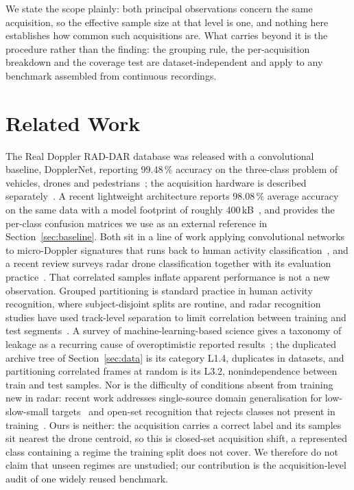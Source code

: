 \documentclass[conference]{IEEEtran}
\begin{document}
We state the scope plainly: both principal observations concern the same acquisition, so the effective sample size at that level is one, and nothing here establishes how common such acquisitions are. What carries beyond it is the procedure rather than the finding: the grouping rule, the per-acquisition breakdown and the coverage test are dataset-independent and apply to any benchmark assembled from continuous recordings.
\section{Related Work}
The Real Doppler RAD-DAR database was released with a convolutional baseline, DopplerNet, reporting 99.48\,\% accuracy on the three-class problem of vehicles, drones and pedestrians~\cite{roldan2020}; the acquisition hardware is described separately~\cite{quevedo2019}. A recent lightweight architecture reports 98.08\,\% average accuracy on the same data with a model footprint of roughly 400\,kB~\cite{zhang2025}, and provides the per-class confusion matrices we use as an external reference in Section~\ref{sec:baseline}. Both sit in a line of work applying convolutional networks to micro-Doppler signatures that runs back to human activity classification~\cite{kim2016}, and a recent review surveys radar drone classification together with its evaluation practice~\cite{ahmad2023}.
That correlated samples inflate apparent performance is not a new observation. Grouped partitioning is standard practice in human activity recognition, where subject-disjoint splits are routine, and radar recognition studies have used track-level separation to limit correlation between training and test segments~\cite{buchman2022}. A survey of machine-learning-based science gives a taxonomy of leakage as a recurring cause of overoptimistic reported results~\cite{kapoor2023}; the duplicated archive tree of Section~\ref{sec:data} is its category L1.4, duplicates in datasets, and partitioning correlated frames at random is its L3.2, nonindependence between train and test samples. Nor is the difficulty of conditions absent from training new in radar: recent work addresses single-source domain generalisation for low-slow-small targets~\cite{chen2025} and open-set recognition that rejects classes not present in training~\cite{bai2026}. Ours is neither: the acquisition carries a correct label and its samples sit nearest the drone centroid, so this is closed-set acquisition shift, a represented class containing a regime the training split does not cover.
 We therefore do not claim that unseen regimes are unstudied; our contribution is the acquisition-level audit of one widely reused benchmark.
\end{document}
